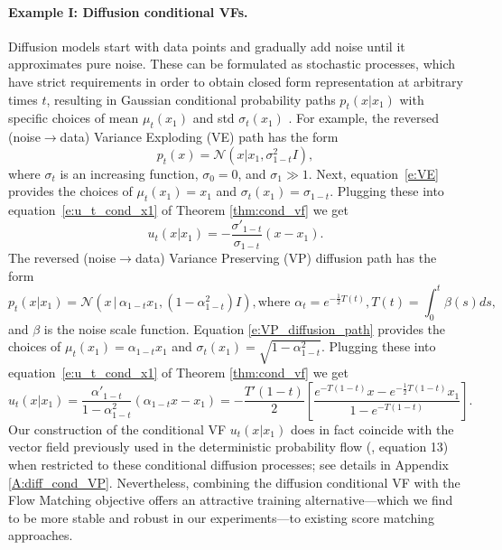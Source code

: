 \documentclass{article}
\newcommand{\parr}[1]{\left (#1\right )}
\newcommand{\brac}[1]{\left [#1\right ]}
\newcommand{\too}{\rightarrow}
\def\eqref#1{equation~\ref{#1}}
\def\gN{{\mathcal{N}}}
\begin{document}
\paragraph{Example I: Diffusion conditional VFs.}
Diffusion models start with data points and gradually add noise until it approximates pure noise. These can be formulated as stochastic processes, which have strict requirements in order to obtain closed form representation at arbitrary times $t$, resulting in Gaussian conditional probability paths $p_t(x\vert x_1)$ with specific choices of mean  $\mu_t(x_1)$ and std $\sigma_t(x_1)$ \citep{sohl2015deep, ho2020denoising,song2020score}. 
For example, the reversed (noise$\too$data) Variance Exploding (VE) path has the form
\begin{equation}\label{e:VE}
    p_t(x) = \gN(x | x_1 , \sigma_{1-t}^2 I ),
\end{equation}
where $\sigma_t$ is an increasing function, $\sigma_0=0$, and $\sigma_1 \gg 1$.  Next, \eqref{e:VE} provides the choices of $\mu_t(x_1)= x_1$ and $\sigma_t(x_1)= \sigma_{1-t}$. Plugging these into \eqref{e:u_t_cond_x1} of Theorem \ref{thm:cond_vf} we get 
\begin{equation}\label{e:u_t_VE}
    u_t(x|x_1) = -\frac{\sigma'_{1-t}}{\sigma_{1-t}}(x-x_1).
\end{equation}
%
The reversed (noise$\too$data) Variance Preserving (VP) diffusion path has the form 
\begin{equation}\label{e:VP_diffusion_path}
    p_t(x\vert x_1) = \gN(x\, \vert \, \alpha_{1-t} x_1 , \parr{1-\alpha_{1-t}^2}I), \text{where } \alpha_t = e^{-\frac{1}{2}T(t)}, T(t)=\int_0^{t} \beta(s)ds, 
\end{equation}
and $\beta$ is the noise scale function. 
Equation \ref{e:VP_diffusion_path} provides the choices of $\mu_t(x_1)=\alpha_{1-t} x_1$ and $\sigma_t(x_1)=\sqrt{1-\alpha_{1-t}^2}$. Plugging these into \eqref{e:u_t_cond_x1} of Theorem \ref{thm:cond_vf} we get 
\begin{equation}\label{e:ut_dif_with_our_method}
    u_t(x\vert x_1) = \frac{\alpha'_{1-t}}{1-\alpha^2_{1-t}} \parr{\alpha_{1-t}x-x_1} = -\frac{T'(1-t)}{2}\brac{
    \frac{e^{-T(1-t)}x - e^{-\frac{1}{2}T(1-t)}x_1}{1-e^{-T(1-t)}}}.
\end{equation}
%
Our construction of the conditional VF $u_t(x|x_1)$ does in fact coincide with the vector field previously used in the deterministic probability flow (\cite{song2020score}, equation 13) when restricted to these conditional diffusion processes; see details in Appendix \ref{A:diff_cond_VP}. 
Nevertheless, combining the diffusion conditional VF with the Flow Matching objective offers an attractive training alternative---which we find to be more stable and robust in our experiments---to existing score matching approaches. 
\end{document}
